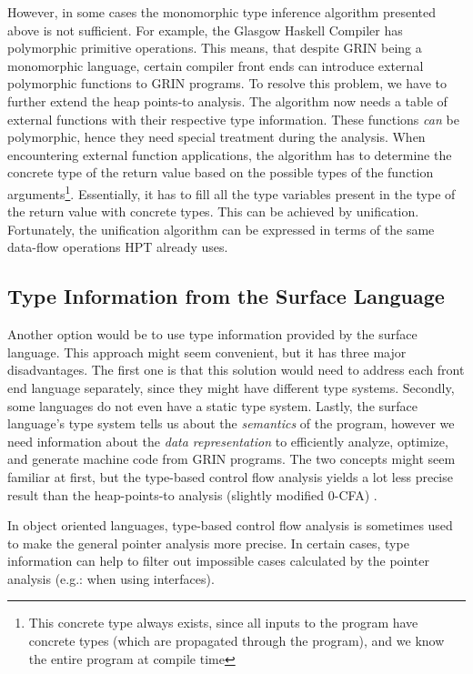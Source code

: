 \documentclass[main.tex]{subfiles}
\begin{document}
	However, in some cases the monomorphic type inference algorithm presented above is not sufficient. For example, the Glasgow Haskell Compiler has polymorphic primitive operations. This means, that despite GRIN being a monomorphic language, certain compiler front ends can introduce external polymorphic functions to GRIN programs. To resolve this problem, we have to further extend the heap points-to analysis. The algorithm now needs a table of external functions with their respective type information. These functions \emph{can} be polymorphic, hence they need special treatment during the analysis. When encountering external function applications, the algorithm has to determine the concrete type of the return value based on the possible types of the function arguments\footnote{This concrete type always exists, since all inputs to the program have concrete types (which are propagated through the program), and we know the entire program at compile time}. Essentially, it has to fill all the type variables present in the type of the return value with concrete types. This can be achieved by unification. Fortunately, the unification algorithm can be expressed in terms of the same data-flow operations HPT already uses.
	
	\subsection{Type Information from the Surface Language}
	
	Another option would be to use type information provided by the surface language. This approach might seem convenient, but it has three major disadvantages. The first one is that this solution would need to address each front end language separately, since they might have different type systems. Secondly, some languages do not even have a static type system. Lastly, the surface language's type system tells us about the \textit{semantics} of the program, however we need information about the \textit{data representation} to efficiently analyze, optimize, and generate machine code from GRIN programs. The two concepts might seem familiar at first, but the type-based control flow analysis yields a lot less precise result than the heap-points-to analysis (slightly modified 0-CFA) \cite{mlton-cfa}. 
	
	In object oriented languages, type-based control flow analysis is sometimes used to make the general pointer analysis more precise. In certain cases, type information can help to filter out impossible cases calculated by the pointer analysis (e.g.: when using interfaces). 
	
	
	
\end{document}
